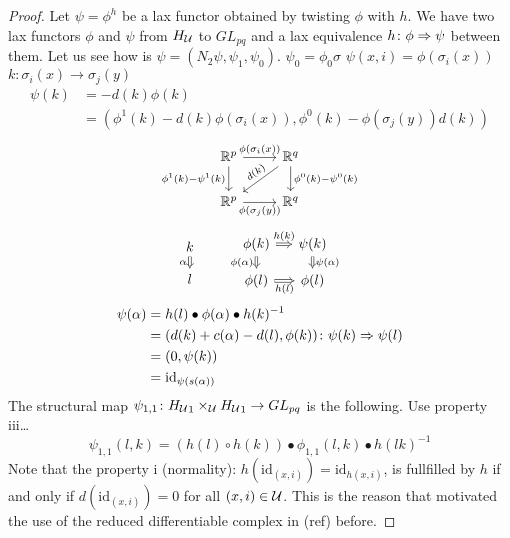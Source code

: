 \begin{proof}
Let $\psi=\phi^h$ be a lax functor obtained by twisting $\phi$ with $h$.
We have two lax functors $\phi$ and $\psi$ from $H_\mathcal U$ to $GL_{pq}$ and a lax equivalence $h\colon\phi\Rightarrow\psi$ between them.
Let us see how is $\psi=(N_2\psi,\psi_1,\psi_0)$.
$\psi_0=\phi_0\sigma$
$\psi(x,i)=\phi(\sigma_i(x))$
$k\colon\sigma_i(x)\to\sigma_j(y)$
\begin{align}
  \psi(k) &= -d(k)\phi(k) \\
  &= (\phi^1(k)-d(k)\phi(\sigma_i(x)), \phi^0(k)-\phi(\sigma_j(y))d(k))
\end{align}
\begin{equation}
\begin{tikzcd}
  \RR^p \ar{r}{\phi(\sigma_i(x))} \ar{d}[left]{\phi^1(k)-\psi^1(k)} & \RR^q \ar{d}{\phi^0(k)-\psi^0(k)} \ar{dl}[sloped, above]{d(k)} \\
  \RR^p \ar{r}[below]{\phi(\sigma_j(y))} & \RR^q
\end{tikzcd}
\end{equation}
\begin{equation}
\begin{tikzcd}[sep = small]
  k \ar[Rightarrow]{d}[left]{\alpha} \\
  l
\end{tikzcd} \qquad
\begin{tikzcd}[sep = small]
  \phi(k) \ar[Rightarrow]{r}{h(k)} \ar[Rightarrow]{d}[left]{\phi(\alpha)} & \psi(k) \ar[Rightarrow]{d}{\psi(\alpha)} \\
  \phi(l) \ar[Rightarrow]{r}[below]{h(l)} & \phi(l)
\end{tikzcd}
\end{equation}
\begin{align}
  \psi(\alpha) &= h(l)\bullet\phi(\alpha)\bullet h(k)^{-1} \\
  &= (d(k)+c(\alpha)-d(l), \phi(k))\colon\psi(k)\Rightarrow\psi(l) \\
  &= (0, \psi(k)) \\
  &= \text{id}_{\psi(s(\alpha))}
\end{align}
The structural map $\psi_{1,1}\colon {H_\mathcal U}_1\times_\mathcal U{H_\mathcal U}_1 \to GL_{pq}$ is the following. Use property iii\dots
\[ \psi_{1,1}(l,k) = (h(l)\circ h(k))\bullet\phi_{1,1}(l,k)\bullet h(lk)^{-1} \]
Note that the property i (normality): $h(\text{id}_{(x,i)})=\text{id}_{h(x,i)}$, is fullfilled by $h$ if and only if $d(\text{id}_{(x,i)})=0$ for all $(x,i)\in\mathcal U$.
This is the reason that motivated the use of the reduced differentiable complex in (ref) before.


\end{proof}
